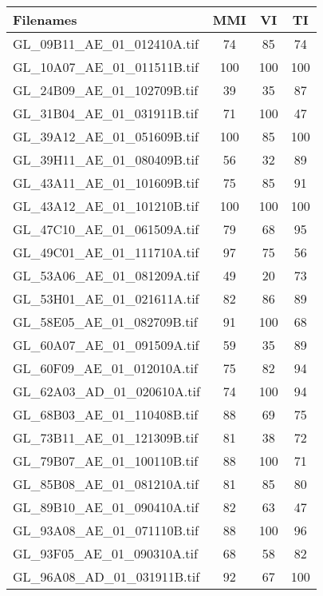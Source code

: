 \begin{tabular}{lccc}
\hline
 Filenames                            & MMI & VI  & TI  \\ \hline \hline
 GL\_09B11\_AE\_01\_012410A.tif & 74  & 85  & 74  \\
 GL\_10A07\_AE\_01\_011511B.tif & 100 & 100 & 100 \\
 GL\_24B09\_AE\_01\_102709B.tif & 39  & 35  & 87  \\
 GL\_31B04\_AE\_01\_031911B.tif & 71  & 100 & 47  \\
 GL\_39A12\_AE\_01\_051609B.tif & 100 & 85  & 100 \\
 GL\_39H11\_AE\_01\_080409B.tif & 56  & 32  & 89  \\
 GL\_43A11\_AE\_01\_101609B.tif & 75  & 85  & 91  \\
 GL\_43A12\_AE\_01\_101210B.tif & 100 & 100 & 100 \\
 GL\_47C10\_AE\_01\_061509A.tif & 79  & 68  & 95  \\
 GL\_49C01\_AE\_01\_111710A.tif & 97  & 75  & 56  \\
 GL\_53A06\_AE\_01\_081209A.tif & 49  & 20  & 73  \\
 GL\_53H01\_AE\_01\_021611A.tif & 82  & 86  & 89  \\
 GL\_58E05\_AE\_01\_082709B.tif & 91  & 100 & 68  \\
 GL\_60A07\_AE\_01\_091509A.tif & 59  & 35  & 89  \\
 GL\_60F09\_AE\_01\_012010A.tif & 75  & 82  & 94  \\
 GL\_62A03\_AD\_01\_020610A.tif & 74  & 100 & 94  \\
 GL\_68B03\_AE\_01\_110408B.tif & 88  & 69  & 75  \\
 GL\_73B11\_AE\_01\_121309B.tif & 81  & 38  & 72  \\
 GL\_79B07\_AE\_01\_100110B.tif & 88  & 100 & 71  \\
 GL\_85B08\_AE\_01\_081210A.tif & 81  & 85  & 80  \\
 GL\_89B10\_AE\_01\_090410A.tif & 82  & 63  & 47  \\
 GL\_93A08\_AE\_01\_071110B.tif & 88  & 100 & 96  \\
 GL\_93F05\_AE\_01\_090310A.tif & 68  & 58  & 82  \\
 GL\_96A08\_AD\_01\_031911B.tif & 92  & 67  & 100 \\
\hline
\end{tabular}